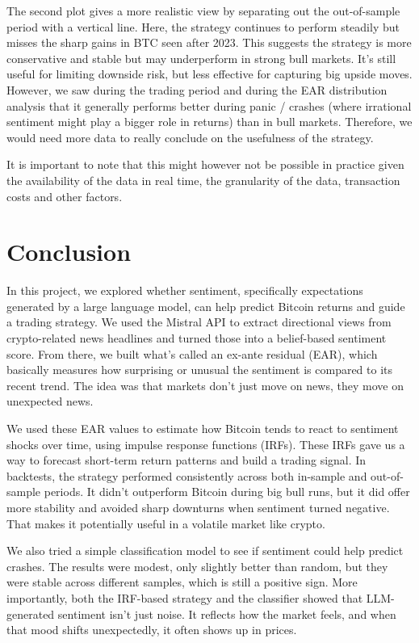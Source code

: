 \documentclass[
  a4paper]{article}
\begin{document}
The second plot gives a more realistic view by separating out the
out-of-sample period with a vertical line. Here, the strategy continues
to perform steadily but misses the sharp gains in BTC seen after 2023.
This suggests the strategy is more conservative and stable but may
underperform in strong bull markets. It's still useful for limiting
downside risk, but less effective for capturing big upside moves.
However, we saw during the trading period and during the EAR
distribution analysis that it generally performs better during panic /
crashes (where irrational sentiment might play a bigger role in returns)
than in bull markets. Therefore, we would need more data to really
conclude on the usefulness of the strategy.

It is important to note that this might however not be possible in
practice given the availability of the data in real time, the
granularity of the data, transaction costs and other factors.

\hypertarget{conclusion}{%
\section{Conclusion}\label{conclusion}}

In this project, we explored whether sentiment, specifically
expectations generated by a large language model, can help predict
Bitcoin returns and guide a trading strategy. We used the Mistral API to
extract directional views from crypto-related news headlines and turned
those into a belief-based sentiment score. From there, we built what's
called an ex-ante residual (EAR), which basically measures how
surprising or unusual the sentiment is compared to its recent trend. The
idea was that markets don't just move on news, they move on unexpected
news.

We used these EAR values to estimate how Bitcoin tends to react to
sentiment shocks over time, using impulse response functions (IRFs).
These IRFs gave us a way to forecast short-term return patterns and
build a trading signal. In backtests, the strategy performed
consistently across both in-sample and out-of-sample periods. It didn't
outperform Bitcoin during big bull runs, but it did offer more stability
and avoided sharp downturns when sentiment turned negative. That makes
it potentially useful in a volatile market like crypto.

We also tried a simple classification model to see if sentiment could
help predict crashes. The results were modest, only slightly better than
random, but they were stable across different samples, which is still a
positive sign. More importantly, both the IRF-based strategy and the
classifier showed that LLM-generated sentiment isn't just noise. It
reflects how the market feels, and when that mood shifts unexpectedly,
it often shows up in prices.
\end{document}
